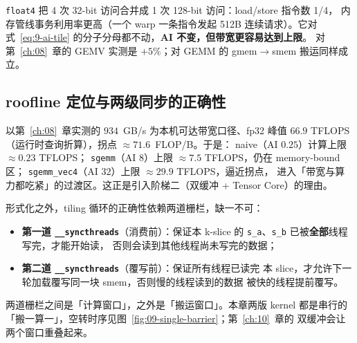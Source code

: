 \texttt{float4} 把 4 次 32-bit 访问合并成 1 次 128-bit 访问：load/store 指令数 1/4，
内存管线事务利用率更高（一个 warp 一条指令发起 512B 连续请求）。它对
式~\ref{eq:9-ai-tile} 的分子分母都不动，\textbf{AI 不变，但带宽更容易达到上限}。
对第~\ref{ch:08}~章的 GEMV 实测是 $+5\%$；对 GEMM 的 gmem$\to$smem 搬运同样成立。

\subsection{roofline 定位与两级同步的正确性}

以第~\ref{ch:08}~章实测的 $934$~GB/s 为本机可达带宽口径、fp32 峰值 $66.9$ TFLOPS
（运行时查询折算），拐点 $\approx 71.6$~FLOP/B。于是：
naive（AI $0.25$）计算上限 $\approx 0.23$ TFLOPS；
\texttt{sgemm}（AI $8$）上限 $\approx 7.5$ TFLOPS，仍在 memory-bound 区；
\texttt{sgemm\_vec4}（AI $32$）上限 $\approx 29.9$ TFLOPS，逼近拐点，
进入「带宽与算力都吃紧」的过渡区。这正是引入阶梯二（双缓冲 + Tensor Core）的理由。

形式化之外，tiling 循环的正确性依赖两道栅栏，缺一不可：
\begin{itemize}
  \item \textbf{第一道 \texttt{\_\allowbreak{}\_\allowbreak{}syncthreads}}（消费前）：保证本 k-slice 的
        \texttt{s\_a}、\texttt{s\_b} 已被\textbf{全部}线程写完，才能开始读，
        否则会读到其他线程尚未写完的数据；
  \item \textbf{第二道 \texttt{\_\allowbreak{}\_\allowbreak{}syncthreads}}（覆写前）：保证所有线程已读完
        本 slice，才允许下一轮加载覆写同一块 smem，否则慢的线程读到的数据
        被快的线程提前覆写。
\end{itemize}
两道栅栏之间是「计算窗口」，之外是「搬运窗口」。本章两版 kernel 都是串行的
「搬一算一」，空转时序见图~\ref{fig:09-single-barrier}；第~\ref{ch:10}~章的
双缓冲会让两个窗口重叠起来。

